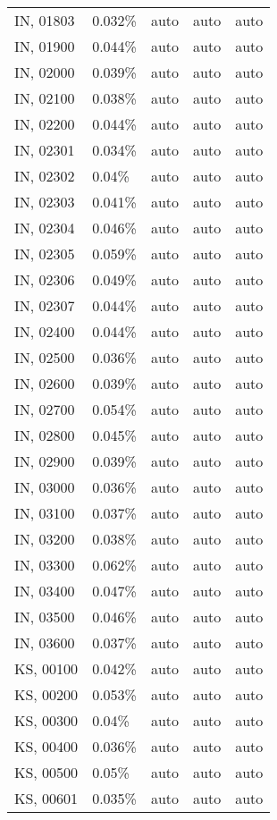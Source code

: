 \begin{longtable}[]{@{}lllll@{}}
IN, 01803 & 0.032\% & auto & auto & auto \\
IN, 01900 & 0.044\% & auto & auto & auto \\
IN, 02000 & 0.039\% & auto & auto & auto \\
IN, 02100 & 0.038\% & auto & auto & auto \\
IN, 02200 & 0.044\% & auto & auto & auto \\
IN, 02301 & 0.034\% & auto & auto & auto \\
IN, 02302 & 0.04\% & auto & auto & auto \\
IN, 02303 & 0.041\% & auto & auto & auto \\
IN, 02304 & 0.046\% & auto & auto & auto \\
IN, 02305 & 0.059\% & auto & auto & auto \\
IN, 02306 & 0.049\% & auto & auto & auto \\
IN, 02307 & 0.044\% & auto & auto & auto \\
IN, 02400 & 0.044\% & auto & auto & auto \\
IN, 02500 & 0.036\% & auto & auto & auto \\
IN, 02600 & 0.039\% & auto & auto & auto \\
IN, 02700 & 0.054\% & auto & auto & auto \\
IN, 02800 & 0.045\% & auto & auto & auto \\
IN, 02900 & 0.039\% & auto & auto & auto \\
IN, 03000 & 0.036\% & auto & auto & auto \\
IN, 03100 & 0.037\% & auto & auto & auto \\
IN, 03200 & 0.038\% & auto & auto & auto \\
IN, 03300 & 0.062\% & auto & auto & auto \\
IN, 03400 & 0.047\% & auto & auto & auto \\
IN, 03500 & 0.046\% & auto & auto & auto \\
IN, 03600 & 0.037\% & auto & auto & auto \\
KS, 00100 & 0.042\% & auto & auto & auto \\
KS, 00200 & 0.053\% & auto & auto & auto \\
KS, 00300 & 0.04\% & auto & auto & auto \\
KS, 00400 & 0.036\% & auto & auto & auto \\
KS, 00500 & 0.05\% & auto & auto & auto \\
KS, 00601 & 0.035\% & auto & auto & auto \\

\end{longtable}

